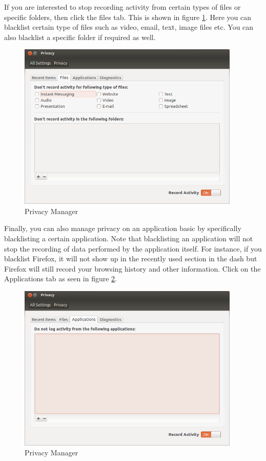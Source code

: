 \par \noindent If you are interested to stop recording activity from certain types of files or specific folders, then click the files tab. This is shown in figure \ref{fig:privacy-files}. Here you can blacklist certain type of files such as video, email, text, image files etc. You can also blacklist a specific folder if required as well.\\

\begin{figure}[h!]	
	\centering
	\includegraphics[width=300pt]{./images/customize-ubuntu/privacy-files.png}
	\caption{Privacy Manager}	
	\label{fig:privacy-files}		
\end{figure}

\par \noindent Finally, you can also manage privacy on an application basic by specifically blacklisting a certain application.  Note that blacklisting an application will not stop the recording of data performed by the application itself. For instance, if you blacklist Firefox, it will not show up in the recently used section in the dash but Firefox will still record your browsing history and other information. Click on the Applications tab as seen in figure \ref{fig:privacy-applications}. \\

\begin{figure}[h!]	
	\centering
	\includegraphics[width=300pt]{./images/customize-ubuntu/privacy-applications.png}
	\caption{Privacy Manager}	
	\label{fig:privacy-applications}		
\end{figure}
